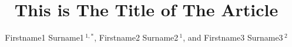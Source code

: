 \documentclass[utf8]{my_class_1_front_vanc}  %
\def\Authors{
        Firstname1 Surname1\,$^{1,*}$,
        Firstname2 Surname2\,$^{1}$, and 
        Firstname3 Surname3\,$^{2}$}
\def\firstAuthorLast{Firstname1 {et~al.}} %
\begin{document}

\onecolumn
{}

\title[This Is The Running Title]{This is The Title of The Article} 

\author[\firstAuthorLast ]{\Authors} 
\address{} 
\correspondence{} 

\extraAuth{}%


\maketitle
\end{document}
